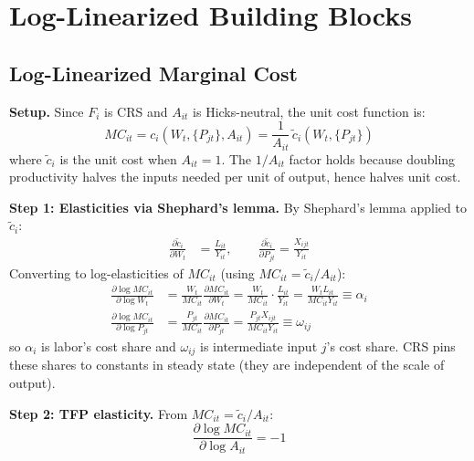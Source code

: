 \documentclass[12pt]{article}
\begin{document}
\section{Log-Linearized Building Blocks}

\subsection{Log-Linearized Marginal Cost}

\textbf{Setup.} Since $F_i$ is CRS and $A_{it}$ is Hicks-neutral, the unit cost function is:
\begin{equation}
    MC_{it} = c_i(W_t, \{P_{jt}\}, A_{it}) = \frac{1}{A_{it}}\,\tilde{c}_i(W_t, \{P_{jt}\})
\end{equation}
where $\tilde{c}_i$ is the unit cost when $A_{it}=1$. The $1/A_{it}$ factor holds because doubling productivity halves the inputs needed per unit of output, hence halves unit cost.

\textbf{Step 1: Elasticities via Shephard's lemma.} By Shephard's lemma applied to $\tilde{c}_i$:
\begin{align}
    \frac{\partial \tilde{c}_i}{\partial W_t} &= \frac{L_{it}}{Y_{it}}, \qquad
    \frac{\partial \tilde{c}_i}{\partial P_{jt}} = \frac{X_{ijt}}{Y_{it}}
\end{align}
Converting to log-elasticities of $MC_{it}$ (using $MC_{it} = \tilde{c}_i/A_{it}$):
\begin{align}
    \frac{\partial \log MC_{it}}{\partial \log W_t}
    &= \frac{W_t}{MC_{it}}\frac{\partial MC_{it}}{\partial W_t}
     = \frac{W_t}{MC_{it}}\cdot\frac{L_{it}}{Y_{it}}
     = \frac{W_t L_{it}}{MC_{it} Y_{it}} \equiv \alpha_i \\[4pt]
    \frac{\partial \log MC_{it}}{\partial \log P_{jt}}
    &= \frac{P_{jt}}{MC_{it}}\frac{\partial MC_{it}}{\partial P_{jt}}
     = \frac{P_{jt} X_{ijt}}{MC_{it} Y_{it}} \equiv \omega_{ij}
\end{align}
so $\alpha_i$ is labor's cost share and $\omega_{ij}$ is intermediate input $j$'s cost share. CRS pins these shares to constants in steady state (they are independent of the scale of output).

\textbf{Step 2: TFP elasticity.} From $MC_{it} = \tilde{c}_i/A_{it}$:
\begin{equation}
    \frac{\partial \log MC_{it}}{\partial \log A_{it}} = -1
\end{equation}
\end{document}
